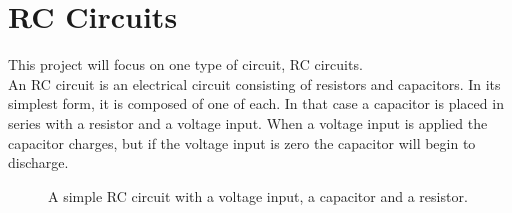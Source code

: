 \chapter{RC Circuits} \label{chap:RC}
This project will focus on one type of circuit, RC circuits.
\\
An RC circuit is an electrical circuit consisting of resistors and capacitors. In its simplest form, it is composed of one of each. In that case a capacitor is placed in series with a resistor and a voltage input. When a voltage input is applied the capacitor charges, but if the voltage input is zero the capacitor will begin to discharge.
\\
\begin{figure}[H]
 
 \caption{A simple RC circuit with a voltage input, a capacitor and a resistor.}
\end{figure}
